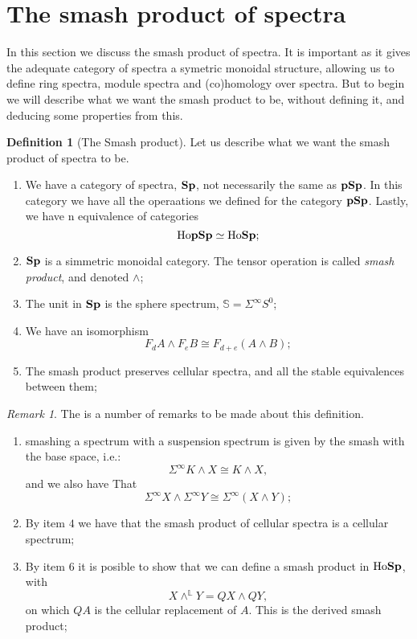 \documentclass[a4paper,english,11pt]{article}
\theoremstyle{definition}
\newtheorem{Def}{Definition}
\theoremstyle{plain}
\theoremstyle{remark}
\newtheorem{rem}{\color{red}Remark}
\newcommand{\pSp}{\textbf{\text{pSp}}}
\newcommand{\Sp}{\textbf{\text{Sp}}}
\newcommand{\Susp}{\Sigma^{\infty}}
\begin{document}
\section{The smash product of spectra}
In this section we discuss the smash product of spectra. It is important as it gives the adequate category of spectra a symetric monoidal structure, allowing us to define ring spectra, module spectra and (co)homology  over spectra. But to begin we will describe what we want the smash product to be, without defining it, and deducing some properties from this.
\begin{Def}[The Smash product]
  Let us describe what we want the smash product of spectra to be. 
  \begin{enumerate}
    \item We have a category of spectra, \(\Sp\), not necessarily the same as \(\pSp\). In this category we have all the operaations we defined for the category \(\pSp\). Lastly, we have n equivalence of categories
    \[\text{Ho}\pSp\simeq\text{Ho}\Sp;\]
    \item \(\Sp\) is a simmetric monoidal category. The tensor operation is called \textit{smash product}, and denoted \(\wedge\);
    \item The unit in \(\Sp\) is the sphere spectrum, \(\mathbb{S}=\Susp S^0\);
    \item We have an isomorphism
    \[F_dA\wedge F_eB\cong F_{d+e}(A\wedge B);\]
    \item The smash product preserves cellular spectra, and all the stable equivalences between them;
  \end{enumerate}
\end{Def} 
\begin{rem}
  The is a number of remarks to be made about this definition.
  \begin{enumerate}
    \item smashing a spectrum with a suspension spectrum is given by the smash with the base space, i.e.:
    \[\Susp K\wedge X\cong K\wedge X,\]
    and we also have That
    \[\Susp X\wedge \Susp Y\cong \Susp(X\wedge Y);\]
    \item By item \(4\) we have that the smash product of cellular spectra is a cellular spectrum;
    \item By item \(6\) it is posible to show that we can define a smash product in \(\text{Ho}\Sp\), with
    \[X\wedge^{\mathbb{L}}Y=QX\wedge QY,\]
    on which \(QA\) is the cellular replacement of \(A\). This is the derived smash product;
  \end{enumerate}
\end{rem}
\end{document}
